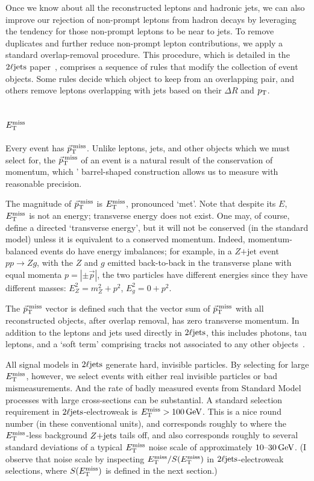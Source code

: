 Once we know about all the reconstructed leptons and hadronic jets, we can
also improve our rejection of non-prompt leptons from hadron decays by
leveraging the tendency for those non-prompt leptons to be near to jets.
To remove duplicates and further reduce non-prompt lepton contributions, we
apply a standard overlap-removal procedure.
This procedure, which is detailed in the $\twoljets$
paper~\cite{atlas2022searches},
comprises a sequence of rules that modify the collection of event objects.
Some rules decide which object to keep from an overlapping pair,
and others remove leptons overlapping with jets based on their $\Delta R$
and $\pt$.


\subsection{\texorpdfstring{$\met$}{ETmiss}}
Every event has $\ptmiss$.
Unlike leptons, jets, and other objects which we must select for, the $\ptmiss$
of an event is a natural result of the conservation of momentum, which \atlas'
barrel-shaped construction allows us to measure with reasonable precision.

The magnitude of $\ptmiss$ is $\met$, pronounced `met'.
Note that despite its $E$, $\met$ is not an energy; transverse energy does not exist.
One may, of course, define a directed `transverse energy', but it will
not be conserved (in the standard model) unless it is equivalent to a conserved
momentum.
Indeed, momentum-balanced events do have energy imbalances;
for example, in a $Z\mathrm{+jet}$ event $pp \to Zg$, with the $Z$ and
$g$ emitted back-to-back in the transverse plane with equal momenta
$p = |\pm \vec p|$, the two particles have different energies since they
have different masses: $E_Z^2 = m_Z^2 + p^2$, $E_g^2 = 0 + p^2$.

The $\ptmiss$ vector is defined such that the vector sum of $\ptmiss$ with
all reconstructed objects, after overlap removal, has zero transverse momentum.
In addition to the leptons and jets used directly in $\twoljets$, this includes
photons, tau leptons, and a `soft term' comprising tracks not associated to
any other objects~\cite{atlas_met}.

All signal models in $\twoljets$ generate hard, invisible particles.
By selecting for large $\met$, however, we select events with either
real invisible particles or bad mismeasurements.
And the rate of badly measured events from Standard Model processes with large
cross-sections can be substantial.
A standard selection requirement in $\twoljets$-electroweak is
$\met > 100\,\eV[G]$.
This is a nice round number (in these conventional units), and corresponds
roughly to where the $\met$-less background $\zjets$ tails off,
and also corresponds roughly to several standard deviations of
a typical $\met$ noise scale of approximately $10\textrm{--}30\,\eV[G]$.
(I observe that noise scale by inspecting $\met / \metsig$ in
$\twoljets$-electroweak selections, where $\metsig$ is defined in the next
section.)


